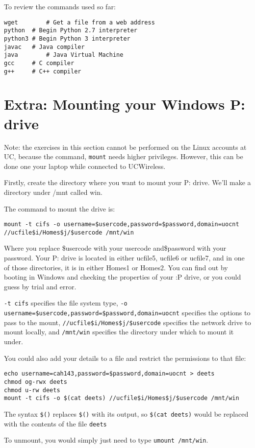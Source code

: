\documentclass{article}
\begin{document}
To review the commands used so far:
\begin{verbatim}
wget		# Get a file from a web address
python	# Begin Python 2.7 interpreter
python3	# Begin Python 3 interpreter
javac	# Java compiler
java		# Java Virtual Machine
gcc		# C compiler
g++		# C++ compiler
\end{verbatim}

\section{Extra: Mounting your Windows P: drive}
Note: the exercises in this section cannot be performed on the Linux accounts at UC, because the command, \texttt{mount} needs higher privileges. However, this can be done one your laptop while connected to UCWireless.

Firstly, create the directory where you want to mount your P: drive. We'll make a directory under /mnt called win.

The command to mount the drive is:
\begin{verbatim}
mount -t cifs -o username=$usercode,password=$password,domain=uocnt
//ucfile$i/Homes$j/$usercode /mnt/win
\end{verbatim}
Where you replace \$usercode with your usercode and\$password with your password. Your P: drive is located in either ucfile5, ucfile6 or ucfile7, and in one of those directories, it is in either Homes1 or Homes2. You can find out by booting in Windows and checking the properties of your :P drive, or you could guess by trial and error.

\texttt{-t cifs} specifies the file system type, \texttt{-o username=\$usercode,password=\$password,domain=uocnt} specifies the options to pass to the mount, \texttt{//ucfile\$i/Homes\$j/\$usercode} specifies the network drive to mount locally, and \texttt{/mnt/win} specifies the directory under which to mount it under.

You could also add your details to a file and restrict the permissions to that file:
\begin{verbatim}
echo username=cah143,password=$password,domain=uocnt > deets
chmod og-rwx deets
chmod u-rw deets
mount -t cifs -o $(cat deets) //ucfile$i/Homes$j/$usercode /mnt/win
\end{verbatim}
The syntax \texttt{\$()} replaces \texttt{\$()} with its output, so \texttt{\$(cat deets)} would be replaced with the contents of the file \texttt{deets}

To unmount, you would simply just need to type \texttt{umount /mnt/win}.
\end{document}
